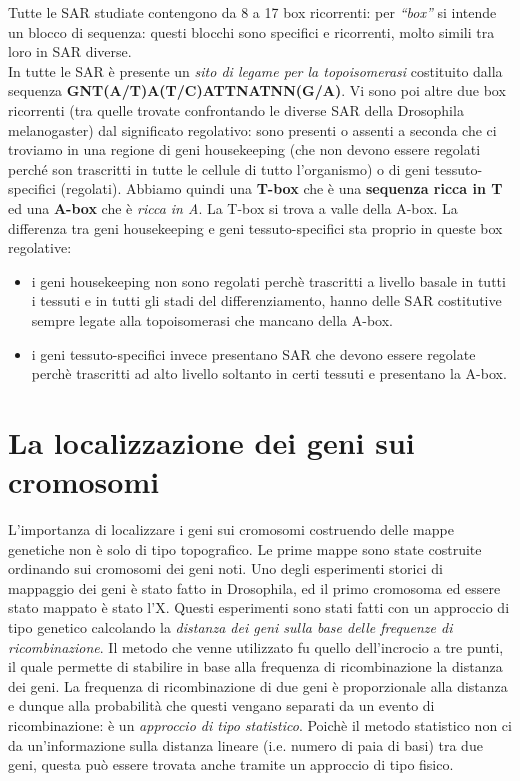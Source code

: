 \documentclass[11pt]{book}
\begin{document}
Tutte le SAR studiate contengono da 8 a 17 box ricorrenti: per \emph{``box''} si intende un blocco di sequenza: questi blocchi sono specifici e ricorrenti, molto simili tra loro in SAR diverse.\\
In tutte le SAR è presente un \emph{sito di legame per la topoisomerasi} costituito dalla sequenza \textbf{GNT(A/T)A(T/C)ATTNATNN(G/A)}. 
Vi sono poi altre due box ricorrenti (tra quelle trovate confrontando le diverse SAR della Drosophila melanogaster) dal significato regolativo: sono presenti o assenti a seconda che ci troviamo in una regione di geni housekeeping (che non devono essere regolati perché son trascritti in tutte le cellule di tutto l’organismo) o di geni tessuto-specifici (regolati). Abbiamo quindi una \textbf{T-box} che è una \textbf{sequenza ricca in T} ed una \textbf{A-box} che è \emph{ricca in A}. La T-box si trova a valle della A-box. La differenza tra geni housekeeping e geni  tessuto-specifici sta proprio in queste box regolative:
\begin{itemize}
\item i geni housekeeping non sono regolati perchè trascritti a livello basale in tutti i tessuti e in tutti gli stadi del differenziamento, hanno delle SAR costitutive sempre legate alla topoisomerasi che mancano della A-box.
\item i geni tessuto-specifici invece presentano SAR che devono essere regolate perchè trascritti ad alto livello soltanto in certi tessuti e presentano la A-box.
\end{itemize}



\chapter{La localizzazione dei geni sui cromosomi}
L’importanza di localizzare i geni sui cromosomi costruendo delle mappe genetiche non è solo di tipo topografico. 
Le prime mappe sono state costruite ordinando sui cromosomi dei geni noti. 
Uno degli esperimenti storici di mappaggio dei geni è stato fatto in Drosophila, ed il primo cromosoma ed essere stato mappato è stato l’X. Questi esperimenti sono stati fatti con un approccio di tipo genetico calcolando la \emph{distanza dei geni sulla base delle frequenze di ricombinazione}. Il metodo che venne utilizzato fu quello dell’incrocio a tre punti, il quale permette di stabilire in base alla frequenza di ricombinazione la distanza dei geni. La frequenza di ricombinazione di due geni è proporzionale alla distanza e dunque alla probabilità che questi vengano separati da un evento di ricombinazione: è un \emph{approccio di tipo statistico}.
Poichè il metodo statistico non ci da un’informazione sulla distanza lineare (i.e. numero di paia di basi) tra due geni, questa può essere trovata anche tramite un approccio di tipo fisico.
\end{document}
